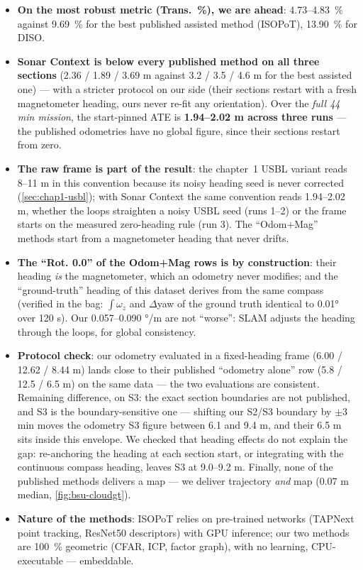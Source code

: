 \begin{itemize}
\item \textbf{On the most robust metric (Trans.~\%), we are ahead}: 4.73--4.83~\%
  against 9.69~\% for the best published assisted method (ISOPoT), 13.90~\% for
  DISO.
\item \textbf{Sonar Context is below every published method on all three
  sections} (2.36 / 1.89 / 3.69 m against 3.2 / 3.5 / 4.6 m for the best assisted
  one) — with a stricter protocol on our side (their sections restart with a fresh
  magnetometer heading, ours never re-fit any orientation). Over the \emph{full
  44 min mission}, the start-pinned ATE is \textbf{1.94--2.02 m across three runs}
  — the published odometries have no global figure, since their sections restart
  from zero.
\item \textbf{The raw frame is part of the result}: the chapter~1 USBL variant
  reads 8--11 m in this convention because its noisy heading seed is never
  corrected (\autoref{sec:chap1-usbl}); with Sonar Context the same convention reads
  1.94--2.02 m, whether the loops straighten a noisy USBL seed (runs 1--2) or the
  frame starts on the measured zero-heading rule (run 3). The ``Odom+Mag'' methods
  start from a magnetometer heading that never drifts.
\item \textbf{The ``Rot. 0.0'' of the Odom+Mag rows is by construction}: their
  heading \emph{is} the magnetometer, which an odometry never modifies; and the
  ``ground-truth'' heading of this dataset derives from the same compass (verified in
  the bag: $\int\omega_z$ and $\Delta$yaw of the ground truth identical to 0.01° over
  120 s). Our 0.057--0.090 °/m are not ``worse'': SLAM adjusts the heading through
  the loops, for global consistency.
\item \textbf{Protocol check}: our odometry evaluated in a fixed-heading frame
  (6.00 / 12.62 / 8.44 m) lands close to their published ``odometry alone'' row
  (5.8 / 12.5 / 6.5 m) on the same data — the two evaluations are consistent.
  Remaining difference, on S3: the exact section boundaries are not published, and
  S3 is the boundary-sensitive one — shifting our S2/S3 boundary by $\pm$3 min
  moves the odometry S3 figure between 6.1 and 9.4 m, and their 6.5 m sits inside
  this envelope. We checked that heading effects do not explain the gap:
  re-anchoring the heading at each section start, or integrating with the
  continuous compass heading, leaves S3 at 9.0--9.2 m. Finally, none of the
  published methods delivers a map — we deliver trajectory \emph{and} map (0.07 m
  median, \autoref{fig:bsu-cloudgt}).
\item \textbf{Nature of the methods}: ISOPoT relies on pre-trained networks (TAPNext
  point tracking, ResNet50 descriptors) with GPU inference; our two methods are
  100~\% geometric (CFAR, ICP, factor graph), with no learning, CPU-executable —
  embeddable.
\end{itemize}
